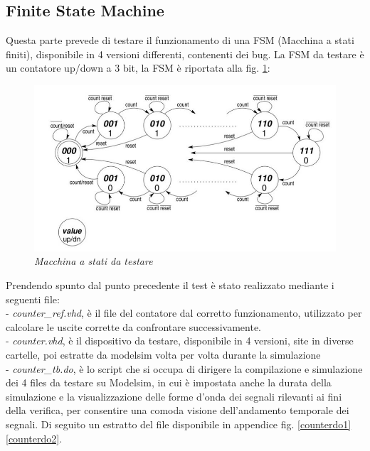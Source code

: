 \subsection{Finite State Machine}
Questa parte prevede di testare il  funzionamento di una FSM (Macchina a stati finiti), disponibile in 4 versioni differenti, contenenti dei bug.  
La FSM da testare è un contatore up/down a 3 bit, la FSM è riportata alla fig. \ref{fsm_lab6}:
\begin{figure}[!htb]
	\centering
	\includegraphics[scale=0.8]{immagini/fsm_lab6}
	\caption{\textit{Macchina a stati da testare}}
	\label{fsm_lab6}
\end{figure}
\newpage
Prendendo spunto dal punto precedente il test è stato realizzato mediante i seguenti file:\\
- \textit{counter\_ref.vhd}, è il file del contatore dal corretto funzionamento, utilizzato per calcolare le uscite corrette da confrontare successivamente.
\\
- \textit{counter.vhd}, è il dispositivo da testare, disponibile in 4 versioni, site in diverse cartelle, poi estratte da modelsim volta per volta durante la simulazione
\\
- \textit{counter\_tb.do}, è lo script che si occupa di dirigere la compilazione e simulazione dei 4 files da testare su Modelsim, in cui è impostata anche la durata della simulazione e la visualizzazione delle forme d’onda dei segnali rilevanti ai fini della verifica, per consentire una comoda visione dell’andamento temporale dei segnali.
Di seguito un estratto del file disponibile in appendice fig. \ref{counterdo1} \ref{counterdo2}.\\
\\
